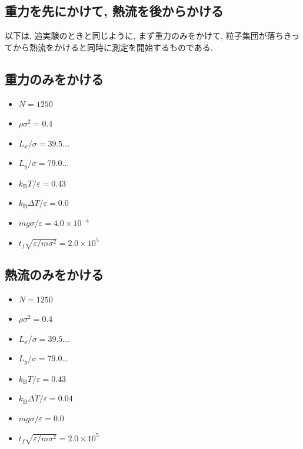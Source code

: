 


\subsection{重力を先にかけて, 熱流を後からかける}

以下は, 追実験のときと同じように, まず重力のみをかけて, 粒子集団が落ちきってから熱流をかけると同時に測定を開始するものである.





\subsection{重力のみをかける}

\begin{itemize}
  \item $N = 1250$
  \item $\rho {\sigma}^2 = 0.4$
  \item $L_x / \sigma = 39.5\dots$
  \item $L_y / \sigma = 79.0\dots$
  \item $k_{\text{B}} T / \varepsilon = 0.43$
  \item $k_{\text{B}} \Delta T / \varepsilon = 0.0$
  \item $mg\sigma/\varepsilon = 4.0 \times 10^{-4}$
  \item $t_f \sqrt{\varepsilon / m \sigma^2} = 2.0 \times 10^{5}$
\end{itemize}

\subsection{熱流のみをかける}

\begin{itemize}
  \item $N = 1250$
  \item $\rho {\sigma}^2 = 0.4$
  \item $L_x / \sigma = 39.5\dots$
  \item $L_y / \sigma = 79.0\dots$
  \item $k_{\text{B}} T / \varepsilon = 0.43$
  \item $k_{\text{B}} \Delta T / \varepsilon = 0.04$
  \item $mg\sigma/\varepsilon = 0.0$
  \item $t_f \sqrt{\varepsilon / m \sigma^2} = 2.0 \times 10^{5}$
\end{itemize}


